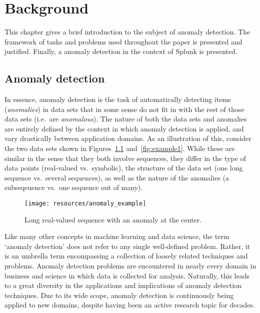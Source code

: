 \chapter{Background}
\label{ch:background}

This chapter gives a brief introduction to the subject of anomaly detection. The framework of tasks and problems used throughout the paper is presented and justified. Finally, a anomaly detection in the context of Splunk is presented.

\section{Anomaly detection}
\label{sect:adb}

In essence, anomaly detection is the task of automatically detecting items (\emph{anomalies}) in data sets that in some sense do not fit in with the rest of those data sets (i.e.\ are \emph{anomalous}). The nature of both the data sets and anomalies are entirely defined by the context in which anomaly detection is applied, and vary drastically between application domains. As an illustration of this, consider the two data sets shown in Figures~\ref{fig:example2} and~\ref{fig:example1}. While these are similar in the sense that they both involve sequences, they differ in the type of data points (real-valued vs.\ symbolic), the structure of the data set (one long sequence vs.\ several sequences), as well as the nature of the anomalies (a subseqeuence vs.\ one sequence out of many).

\begin{figure}[htb]
    \centering
    \texttt{[image: resources/anomaly\_example]}
    \caption{\small Long real-valued sequence with an anomaly at the center.}
    \vspace{-0pt}
\label{fig:example2}
\end{figure}

Like many other concepts in machine learning and data science, the term `anomaly detection' does not refer to any single well-defined problem. Rather, it is an umbrella term encompassing a collection of loosely related techniques and problems. Anomaly detection problems are encountered in nearly every domain in business and science in which data is collected for analysis. Naturally, this leads to a great diversity in the applications and implications of anomaly detection techniques. Due to its wide scope, anomaly detection is continuously being applied to new domains, despite having been an active research topic for decades.

